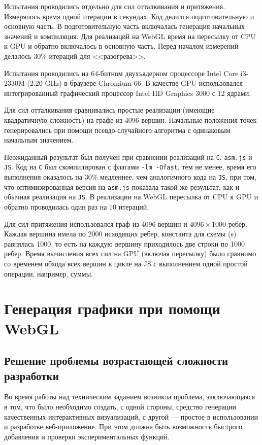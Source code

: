 Испытания проводились отдельно для сил отталкивания и притяжения. Измерялось время одной итерации в секундах. Код делился подготовительную и основную часть. В подготовительную часть включалась генерация начальных значений и компиляция. Для реализаций на WebGL время на пересылку от CPU к GPU и обратно включалось в основную часть. Перед началом измерений делалось $30\%$ итераций для <<разогрева>>.

Испытания проводились на 64-битном двухъядерном процессоре Intel Core i3-2330M (2.20 GHz) в браузере Chromium 66. В качестве GPU использовался интегрированный графический процессор Intel HD Graphics 3000 с 12 ядрами.

Для сил отталкивания сравнивались простые реализации (имеющие квадратичную сложность) на графе из 4096 вершин. Начальные положения точек генерировались при помощи псевдо-случайного алгоритма с одинаковым начальным значением.

Неожиданный результат был получен при сравнении реализаций на \texttt{C}, \texttt{asm.js} и \texttt{JS}. Код на \texttt{C} был скомпилирован с флагами \texttt{-lm -Ofast}, тем не менее, время его выполнения оказалось на $30\%$ медленнее, чем аналогичного кода на \texttt{JS}, при том, что оптимизированная версия на \texttt{asm.js} показала такой же результат, как и обычная реализация на \texttt{JS}. В реализации на WebGL пересылка от CPU к GPU и обратно проводилась один раз на 10 итераций.

Для сил притяжения использовался граф из 4096 вершин и $4096 \times 1000$ ребер. Каждая вершина имела по 2000 исходящих ребер, константа для схемы (s) равнялась 1000, то есть на каждую вершину приходилось две строки по 1000 ребер. Время вычисления всех сил на GPU (включая пересылку) было сравнимо со временем обхода всех вершин в цикле на JS с выполнением одной простой операции, например, суммы.

\chapter{Генерация графики при помощи WebGL}

\section{Решение проблемы возрастающей сложности разработки}

Во время работы над техническим заданием возникла проблема, заключающаяся в том, что было необходимо создать, с одной стороны, средство генерации качественных интерактивных визуализаций, с другой --- простое в использовании и разработке веб-приложение. При этом должна быть возможность быстрого добавления и проверки экспериментальных функций.

